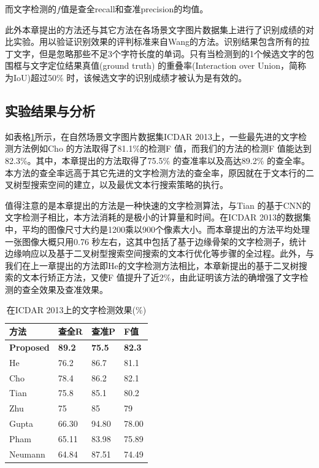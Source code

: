         而文字检测的$f$值是查全recall和查准precision的均值。

        此外本章提出的方法还与其它方法在各场景文字图片数据集上进行了识别成绩的对比实验。用以验证识别效果的评判标准来自Wang\cite{Wang2012End}的方法。识别结果包含所有的拉丁文字，但是忽略那些不足3个字符长度的单词。只有当检测到的1个候选文字的包围框与文字定位结果真值(ground truth) 的重叠率(Interaction over Union，简称为IoU)超过50\% 时，该候选文字的识别成绩才被认为是有效的。

        \subsection{实验结果与分析}

        如表格\ref{tab.c4_icdar13}所示，在自然场景文字图片数据集ICDAR 2013上，一些最先进的文字检测方法例如Cho\cite{Cho2016Canny} 的方法取得了81.1\%的检测F 值，而我们的方法的检测F 值能达到82.3\%。其中，本章提出的方法取得了75.5\% 的查准率以及高达89.2\% 的查全率。本方法的查全率远高于其它先进的文字检测方法的查全率，原因就在于文本行的二叉树型搜索空间的建立，以及最优文本行搜索策略的执行。

        值得注意的是本章提出的方法是一种快速的文字检测算法，与Tian\cite{Tian2016Text} 的基于CNN的文字检测子相比，本方法消耗的是极小的计算量和时间。在ICDAR 2013的数据集中，平均的图像尺寸大约是1200乘以900个像素大小。而本章提出的方法平均处理一张图像大概只用0.76 秒左右，这其中包括了基于边缘骨架的文字检测子，统计边缘响应以及基于二叉树型搜索空间搜索的文本行优化等步骤的全过程。此外，与我们在上一章提出的方法即He\cite{He2017scene}的文字检测方法相比，本章新提出的基于二叉树搜索的文本行矫正方法，又使F 值提升了近2\%，由此证明该方法的确增强了文字检测的查全效果及查准效果。

        \begin{table}[!h]
        \centering
        \caption{在ICDAR 2013上的文字检测效果(\%)}
        \begin{tabular}{p{}|p{} p{} p{}}
        \hline
        方法 & 查全R & 查准P & F值 \\
        \hline
        \textbf{Proposed} & \textbf{89.2} & \textbf{75.5} & \textbf{82.3}\\
        He\cite{He2017scene} & 76.2 & 86.7 & 81.1 \\
        Cho\cite{Cho2016Canny} & 78.4 & 86.2 & 82.1 \\
        Tian\cite{Tian2016Text} & 75.8 & 85.1 & 80.2 \\
        Zhu\cite{Zhu2016Text} & 75 & 85 & 79 \\
        Gupta\cite{Gupta2016Synthetic} & 66.30 & 94.80 & 78.00 \\
        Pham\cite{Pham2016Robust} & 65.11 & 83.98 & 75.89 \\
        Neumann\cite{Neumann2012Real} & 64.84 & 87.51 & 74.49 \\
        \hline
        \end{tabular}
        \label{tab.c4_icdar13}
        \end{table}

